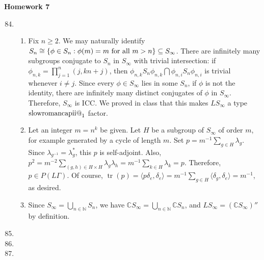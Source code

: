 \documentclass[a4paper,10pt]{report}
\makeatletter
\newcommand{\ggen}[1]{\langle#1\rangle}
\DeclarePairedDelimiter{\set}{\{}{\}}
\newcommand{\N}{\mathbb{N}}
\newcommand{\C}{\mathbb{C}}
\DeclareMathOperator{\tr}{tr}
\newcommand{\Romnum}[1]{\expandafter\@slowromancap\romannumeral #1@}
\newcommand{\factor}[1]{\text{\Romnum{#1}}}
\makeatother
\begin{document}

\pagestyle{fancy}	
\fancyhf{} %
\setlength{\headheight}{60pt}

\begin{center}
	\textbf{Homework 7}
\end{center}

\begin{enumerate}
		\setcounter{enumi}{83}
 \item 
		\begin{enumerate}
			\item Fix $n\ge 2$. We may naturally identify $S_n\cong\set{\phi\in S_n:\phi(m)=m\text{ for all }m>n}\subseteq S_\infty$. There are infinitely many subgroups conjugate to $S_n$ in $S_\infty$ with trivial intersection: if $\phi_{n,k}=\prod_{j=1}^n(j,kn+j)$, then $\phi_{n,k}S_n\phi_{n,k}\bigcap\phi_{n,i}S_n\phi_{n,i}$ is trivial whenever $i\neq j$. Since every $\phi\in S_\infty$ lies in some $S_n$, if $\phi$ is not the identity, there are infinitely many distinct conjugates of $\phi$ in $S_\infty$. Therefore, $S_\infty$ is ICC. We proved in class that this makes $LS_\infty$ a type $\factor{2}_1$ factor. 
			\item Let an integer $m=n^k$ be given. Let $H$ be a subgroup of $S_\infty$ of order $m$, for example generated by a cycle of length $m$. Set $p=m^{-1}\sum_{g\in H}\lambda_g$. Since $\lambda_{g^{-1}}=\lambda_g^*$, this $p$ is self-adjoint. Also, $p^2=m^{-2}\sum_{(g,h)\in H\times H}\lambda_g\lambda_h=m^{-1}\sum_{k\in H}\lambda_k=p$. Therefore, $p\in P(L\Gamma)$. Of course, $\tr(p)=\ggen{p\delta_e,\delta_e}=m^{-1}\sum_{g\in H}\ggen{\delta_g,\delta_e}=m^{-1}$, as desired. 
			\item Since $S_\infty=\bigcup_{n\in\N}S_n$, we have $\C S_\infty=\bigcup_{n\in\N}\C S_n$, and $LS_\infty=(\C S_\infty)''$ by definition. 
		\end{enumerate}
		\setcounter{enumi}{85}
 \item 
 \item 
 \item 
\end{enumerate}
\end{document}
